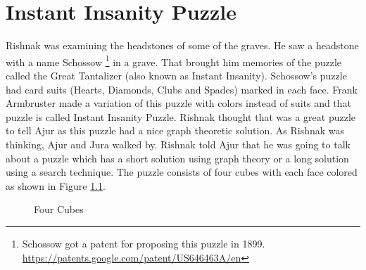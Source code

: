 \chapter{Instant Insanity Puzzle}

Rishnak was examining the headstones of some of the graves. He saw a headstone with a name Schossow \footnote{ Schossow got a patent for proposing this puzzle in 1899. \url{https://patents.google.com/patent/US646463A/en} }  in a grave. That brought him memories of the puzzle called the Great Tantalizer (also known as Instant Insanity). Schossow's puzzle had card suits (Hearts, Diamonds, Clubs and Spades) marked in each face. Frank Armbruster made a variation of this puzzle with colors instead of suits and that puzzle is called Instant Insanity Puzzle.
Rishnak thought that was a great puzzle to tell Ajur as this puzzle had a nice graph theoretic solution. As Rishnak was thinking, Ajur and Jura walked by. Rishnak told Ajur that he was going to talk about a puzzle which has a short solution using graph theory or a long solution using a search technique. The puzzle consists of four cubes with each face colored as shown in Figure \ref{22p1}. 
\begin{figure}
\begin{center}
\caption{ Four Cubes}\label{22p1}
\end{center}
\end{figure}

